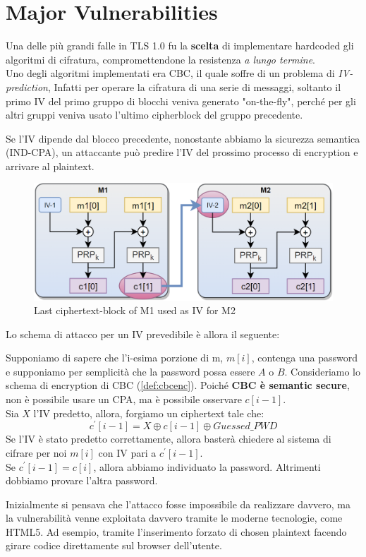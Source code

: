 \section{Major Vulnerabilities}
Una delle più grandi falle in TLS 1.0 fu la \textbf{scelta} di implementare hardcoded gli algoritmi di cifratura, compromettendone la resistenza \textit{a lungo termine}.\\
Uno degli algoritmi implementati era CBC, il quale soffre di un problema di \textit{IV-prediction}, Infatti per operare la cifratura di una serie di messaggi, soltanto il primo IV del primo gruppo di blocchi veniva generato "on-the-fly", perché per gli altri gruppi veniva usato l'ultimo cipherblock del gruppo precedente.\\
\begin{remark}
Se l'IV dipende dal blocco precedente, nonostante abbiamo la sicurezza semantica (IND-CPA), un attaccante può predire l'IV del prossimo processo di encryption e arrivare al plaintext.
\end{remark}
\begin{figure}[ht]
    \centering
    \includegraphics{image/ivpred.png}
    \caption{Last ciphertext-block of M1 used as IV for M2}
    \label{fig:ivpred}
\end{figure}\pagebreak
Lo schema di attacco per un IV prevedibile è allora il seguente:
\begin{definition}\label{def:ivpredatk}
Supponiamo di sapere che l'i-esima porzione di m, $m[i]$, contenga una password e supponiamo per semplicità che la password possa essere $A$ o $B$. Consideriamo lo schema di encryption di CBC (\cref{def:cbcenc}). Poiché \textbf{CBC è semantic secure}, non è possibile usare un CPA, ma è possibile osservare $c[i-1]$.\\
Sia $X$ l'IV predetto, allora, forgiamo un ciphertext tale che:
\[c^{'}[i-1]=X\oplus{c[i-1]}\oplus{Guessed\_PWD}\]
Se l'IV è stato predetto correttamente, allora basterà chiedere al sistema di cifrare per noi $m[i]$ con IV pari a  $c^{'}[i-1]$. \\
Se $c^{'}[i-1]=c[i]$, allora abbiamo individuato la password. Altrimenti dobbiamo provare l'altra password.
\end{definition}
\begin{note}
Inizialmente si pensava che l'attacco fosse impossibile da realizzare davvero, ma la vulnerabilità venne exploitata davvero tramite le moderne tecnologie, come HTML5. Ad esempio, tramite l'inserimento forzato di chosen plaintext facendo girare codice direttamente sul browser dell'utente.
\end{note}
